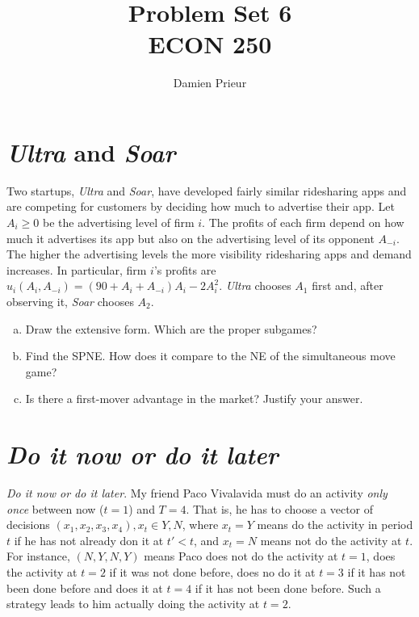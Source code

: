 \documentclass{article}
\author{Damien Prieur}
\title{Problem Set 6 \\ ECON 250}
\date{}
\begin{document}
\maketitle

\section{\emph{Ultra} and \emph{Soar}}
Two startups, \emph{Ultra} and \emph{Soar}, have developed fairly similar ridesharing apps and are competing for customers by deciding how much to advertise their app.
Let $A_{i} \ge 0$ be the advertising level of firm $i$.
The profits of each firm depend on how much it advertises its app but also on the advertising level of its opponent $A_{-i}$.
The higher the advertising levels the more visibility ridesharing apps and demand increases.
In particular, firm $i$'s profits are $u_{i}(A_{i},A_{-i}) = (90 + A_{i} + A_{-i})A_{i}-2A_{i}^{2}$.
\emph{Ultra} chooses $A_{1}$ first and, after observing it, \emph{Soar} chooses $A_{2}$.
\begin{enumerate}[(a)]
\item Draw the extensive form. Which are the proper subgames?

\item Find the SPNE. How does it compare to the NE of the simultaneous move game?

\item Is there a first-mover advantage in the market? Justify your answer.

\end{enumerate}

\section{\emph{Do it now or do it later}}
\emph{Do it now or do it later}. My friend Paco Vivalavida must do an activity \emph{only once} between now ($t = 1$) and $T = 4$.
That is, he has to choose a vector of decisions $(x_1,x_2,x_3,x_4), x_t \in {Y,N}$, where $x_t = Y$ means do the activity in period $t$ if he has not already don it at $t'<t$, and $x_t = N$ means not do the activity at $t$.
For instance, $(N,Y,N,Y)$ means Paco does not do the activity at $t = 1$, does the activity at $t = 2$ if it was not done before, does no do it at $t = 3$ if it has not been done before and does it at $t=4$ if it has not been done before.
Such a strategy leads to him actually doing the activity at $t = 2$.
\end{document}
